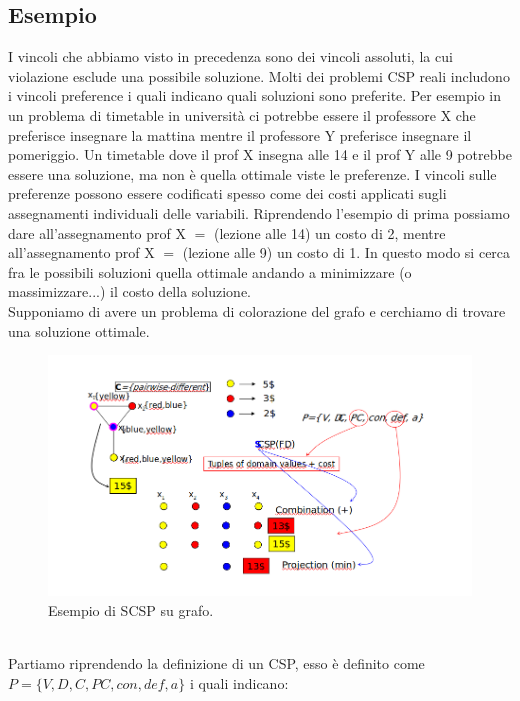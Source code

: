\subsection{Esempio}
I vincoli che abbiamo visto in precedenza sono dei vincoli assoluti, la cui
violazione esclude una possibile soluzione. Molti dei problemi CSP reali
includono i vincoli preference i quali indicano quali soluzioni sono preferite.
Per esempio in un problema di timetable in università ci potrebbe essere il
professore X che preferisce insegnare la mattina mentre il professore Y
preferisce insegnare il pomeriggio. Un timetable dove il prof X insegna alle 14
e il prof Y alle 9 potrebbe essere una soluzione, ma non è quella ottimale viste
le preferenze. I vincoli sulle preferenze possono essere codificati spesso come
dei costi applicati sugli assegnamenti individuali delle variabili. Riprendendo
l'esempio di prima possiamo dare all'assegnamento prof X $=$ (lezione alle 14)
un costo di 2, mentre all'assegnamento prof X $=$ (lezione alle 9) un costo di
1. In questo modo si cerca fra le possibili soluzioni quella ottimale andando a
minimizzare (o massimizzare...) il costo della soluzione. \\Supponiamo di avere
un problema di colorazione del grafo e cerchiamo di trovare una soluzione
ottimale.
\begin{figure}[htp]
    \centering
    \includegraphics[width=14cm, keepaspectratio]{img/Cap4/scsp2.png}
    \caption{Esempio di SCSP su grafo.}
\end{figure}
\\Partiamo riprendendo la definizione di un CSP, esso è definito come
$P=\{V,D,C,PC,con,def,a\}$ i quali indicano:
